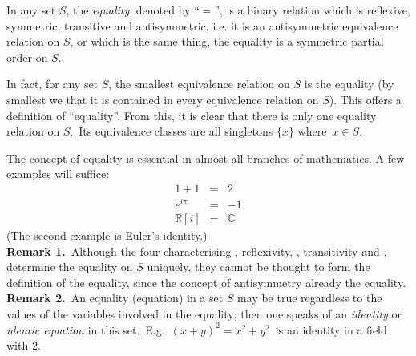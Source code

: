 \documentclass[12pt]{article}
\theoremstyle{definition}
\begin{document}
In any set $S$, the {\em equality}, denoted by ``$=$'', is a binary relation which is reflexive, symmetric, transitive and antisymmetric, i.e. it is an antisymmetric equivalence relation on $S$, or which is the same thing, the equality is a symmetric partial order on $S$.

In fact, for any set $S$, the smallest equivalence relation on $S$ is the equality (by smallest we  that it is contained in every equivalence relation on $S$).  This offers a definition of ``equality''.  From this, it is clear that there is only one equality relation on $S$.\, Its equivalence classes are all singletons $\{x\}$ where\, $x \in S$.

The concept of equality is essential in almost all branches of mathematics.  A few examples will suffice:
\begin{eqnarray*}
1 + 1 & = & 2 \\
e^{i \pi} & = & -1 \\
\mathbb{R}[i] & = & \mathbb{C}
\end{eqnarray*}
(The second example is Euler's identity.)\\

\textbf{Remark 1.}\, Although the four characterising , reflexivity, , transitivity and , determine the equality on $S$ uniquely, they cannot be thought to form the definition of the equality, since the concept of antisymmetry already  the equality.\\

\textbf{Remark 2.}\, An equality (equation) in a set $S$ may be true regardless to the values of the variables involved in the equality; then one speaks of an {\em identity} or {\em identic equation} in this set.\, E.g.\, $(x+y)^2 = x^2+y^2$\, is an identity in a field with  $2$.

\end{document}
